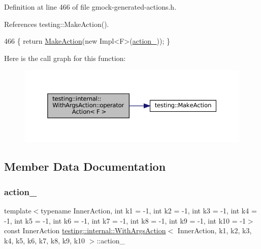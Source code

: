 Definition at line 466 of file gmock-\/generated-\/actions.\+h.



References testing\+::\+Make\+Action().


\begin{DoxyCode}
466 \{ \textcolor{keywordflow}{return} \hyperlink{namespacetesting_ae6b9960db2b2685e043ce5215291f5b8}{MakeAction}(\textcolor{keyword}{new} Impl<F>(\hyperlink{classtesting_1_1internal_1_1WithArgsAction_a2afd51ea9f4b1c73e1dd7035b4dbee27}{action\_})); \}
\end{DoxyCode}
Here is the call graph for this function\+:
\nopagebreak
\begin{figure}[H]
\begin{center}
\leavevmode
\includegraphics[width=350pt]{classtesting_1_1internal_1_1WithArgsAction_ab6d8f89fd5a54f2914da2523b2ba6ee5_cgraph}
\end{center}
\end{figure}


\subsection{Member Data Documentation}
\mbox{\label{classtesting_1_1internal_1_1WithArgsAction_a2afd51ea9f4b1c73e1dd7035b4dbee27}} 
\subsubsection{\texorpdfstring{action\+\_\+}{action\_}}
{\footnotesize\ttfamily template$<$typename Inner\+Action, int k1 = -\/1, int k2 = -\/1, int k3 = -\/1, int k4 = -\/1, int k5 = -\/1, int k6 = -\/1, int k7 = -\/1, int k8 = -\/1, int k9 = -\/1, int k10 = -\/1$>$ \\
const Inner\+Action \hyperlink{classtesting_1_1internal_1_1WithArgsAction}{testing\+::internal\+::\+With\+Args\+Action}$<$ Inner\+Action, k1, k2, k3, k4, k5, k6, k7, k8, k9, k10 $>$\+::action\+\_\+\hspace{0.3cm}{\ttfamily [private]}}



